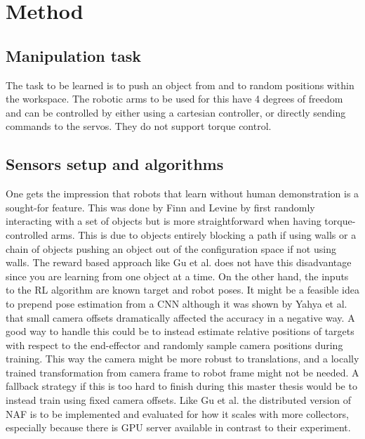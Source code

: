 \section{Method}

\subsection{Manipulation task}

The task to be learned is to push an object from and to random positions within
the workspace. The robotic arms to be used for this have 4 degrees of freedom
and can be controlled by either using a cartesian controller, or directly
sending commands to the servos. They do not support torque control.

\subsection{Sensors setup and algorithms}

One gets the impression that robots that learn without human demonstration is a
sought-for feature. This was done by Finn and Levine \cite{finn2016deep} by
first randomly interacting with a set of objects but is more straightforward
when having torque-controlled arms. This is due to objects entirely blocking a
path if using walls or a chain of objects pushing an object out of the
configuration space if not using walls. The reward based approach like Gu et
al. \cite{gu2016deep} does not have this disadvantage since you are learning
from one object at a time. On the other hand, the inputs to the RL algorithm
are known target and robot poses. It might be a feasible idea to prepend pose
estimation from a CNN \cite{yahya2016collective,chebotar2016path,levine2016end}
although it was shown by Yahya et al. \cite{yahya2016collective} that small
camera offsets dramatically affected the accuracy in a negative way. A good way
to handle this could be to instead estimate relative positions of targets with
respect to the end-effector and randomly sample camera positions during
training. This way the camera might be more robust to translations, and a
locally trained transformation from camera frame to robot frame might not be
needed. A fallback strategy if this is too hard to finish during this master
thesis would be to instead train using fixed camera offsets. Like Gu et al.
\cite{gu2016deep} the distributed version of NAF is to be implemented and
evaluated for how it scales with more collectors, especially because there is
GPU server available in contrast to their experiment.

